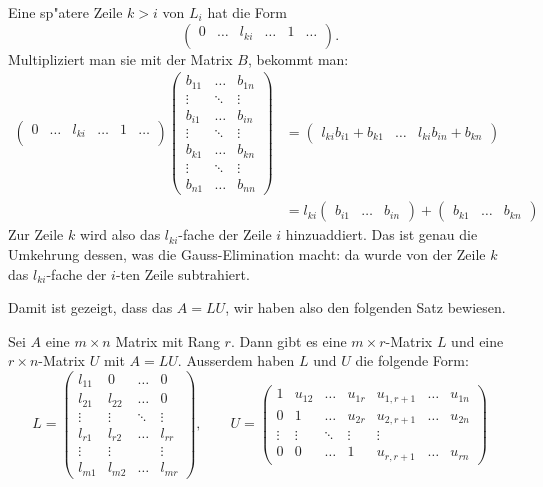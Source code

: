 Eine sp"atere Zeile $k>i$ von $L_i$ hat die Form
\[
\begin{pmatrix}
0&\dots&l_{ki}&\dots&1&\dots\\
\end{pmatrix}.
\]
Multipliziert man sie mit der Matrix $B$, bekommt man:
\begin{align*}
\begin{pmatrix}
0&\dots&l_{ki}&\dots&1&\dots\\
\end{pmatrix}
\begin{pmatrix}
b_{11}&\dots &b_{1n}\\
\vdots&\ddots&\vdots\\
b_{i1}&\dots &b_{in}\\
\vdots&\ddots&\vdots\\
b_{k1}&\dots&b_{kn}\\
\vdots&\ddots&\vdots\\
b_{n1}&\dots &b_{nn}
\end{pmatrix}
&=
\begin{pmatrix}
l_{ki}b_{i1}+b_{k1}
&\dots&
l_{ki}b_{in}+b_{kn}
\end{pmatrix}
\\
&=
l_{ki}
\begin{pmatrix}
b_{i1}
&\dots&
b_{in}
\end{pmatrix}
+
\begin{pmatrix}
b_{k1}
&\dots&
b_{kn}
\end{pmatrix}
\end{align*}
Zur Zeile $k$ wird also das $l_{ki}$-fache der Zeile
$i$ hinzuaddiert.
Das ist genau die Umkehrung dessen, was
die Gauss-Elimination macht: da wurde von der Zeile $k$
das $l_{ki}$-fache der $i$-ten Zeile subtrahiert.

Damit ist gezeigt, dass das $A=LU$, wir haben also den folgenden
Satz bewiesen.

\begin{satz}[LU-Zerlegung]
\label{ludecomposition}
Sei $A$ eine $m\times n$ Matrix mit Rang $r$.
Dann gibt es eine $m\times r$-Matrix $L$ und eine $r\times n$-Matrix
$U$ mit $A=LU$.
Ausserdem haben $L$ und $U$ die folgende Form:
\[
L=\begin{pmatrix}
l_{11}&0&\dots&0\\
l_{21}&l_{22}&\dots&0\\
\vdots&\vdots&\ddots&\vdots\\
l_{r1}&l_{r2}&\dots&l_{rr}\\
\vdots&\vdots& &\vdots\\
l_{m1}&l_{m2}&\dots&l_{mr}
\end{pmatrix},\qquad
U=\begin{pmatrix}
1&u_{12}&\dots&u_{1r}&u_{1,r+1}&\dots&u_{1n}\\
0&1     &\dots&u_{2r}&u_{2,r+1}&\dots&u_{2n}\\
\vdots&\vdots&\ddots&\vdots&\vdots\\
0&0&\dots&1&u_{r,r+1}&\dots&u_{rn}
\end{pmatrix}
\]
\end{satz}

